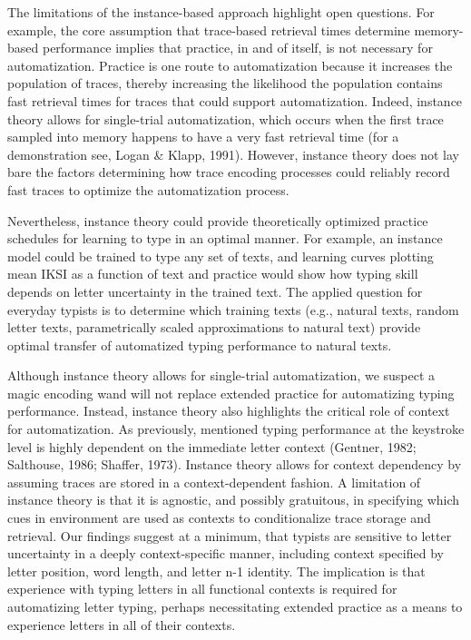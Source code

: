\documentclass[,man,floatsintext]{apa6}
\begin{document}
The limitations of the instance-based approach highlight open questions. For example, the core assumption that trace-based retrieval times determine memory-based performance implies that practice, in and of itself, is not necessary for automatization. Practice is one route to automatization because it increases the population of traces, thereby increasing the likelihood the population contains fast retrieval times for traces that could support automatization. Indeed, instance theory allows for single-trial automatization, which occurs when the first trace sampled into memory happens to have a very fast retrieval time (for a demonstration see, Logan \& Klapp, 1991). However, instance theory does not lay bare the factors determining how trace encoding processes could reliably record fast traces to optimize the automatization process.

Nevertheless, instance theory could provide theoretically optimized practice schedules for learning to type in an optimal manner. For example, an instance model could be trained to type any set of texts, and learning curves plotting mean IKSI as a function of text and practice would show how typing skill depends on letter uncertainty in the trained text. The applied question for everyday typists is to determine which training texts (e.g., natural texts, random letter texts, parametrically scaled approximations to natural text) provide optimal transfer of automatized typing performance to natural texts.

Although instance theory allows for single-trial automatization, we suspect a magic encoding wand will not replace extended practice for automatizing typing performance. Instead, instance theory also highlights the critical role of context for automatization. As previously, mentioned typing performance at the keystroke level is highly dependent on the immediate letter context (Gentner, 1982; Salthouse, 1986; Shaffer, 1973). Instance theory allows for context dependency by assuming traces are stored in a context-dependent fashion. A limitation of instance theory is that it is agnostic, and possibly gratuitous, in specifying which cues in environment are used as contexts to conditionalize trace storage and retrieval. Our findings suggest at a minimum, that typists are sensitive to letter uncertainty in a deeply context-specific manner, including context specified by letter position, word length, and letter n-1 identity. The implication is that experience with typing letters in all functional contexts is required for automatizing letter typing, perhaps necessitating extended practice as a means to experience letters in all of their contexts.
\end{document}
